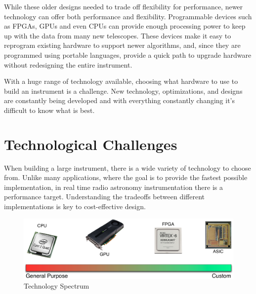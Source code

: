 

While these older designs needed to trade off flexibility for performance, newer technology can offer both performance and flexibility.
Programmable devices such as FPGAs, GPUs and even CPUs can provide enough processing power to keep up with the data from many new telescopes.
These devices make it easy to reprogram existing hardware to support newer algorithms, and, since they are programmed using portable languages, provide a quick path to upgrade hardware without redesigning the entire instrument.

With a huge range of technology available, choosing what hardware to use to build an instrument is a challenge. 
New technology, optimizations, and designs are constantly being developed and with everything constantly changing it's difficult to know what is best.



\section{Technological Challenges}

When building a large instrument, there is a wide variety of technology to choose from.
Unlike many applications, where the goal is to provide the fastest possible implementation, in real time radio astronomy instrumentation there is a performance target.
Understanding the tradeoffs between different implementations is key to cost-effective design.

\begin{figure}[ht!]
  \centering
    \includegraphics[width=\textwidth]{Images/C1/design_space.pdf}
  \caption{Technology Spectrum}
  \label{fig: C1/design_space.pdf}
\end{figure}

